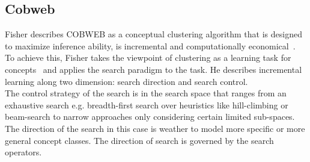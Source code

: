 \subsection{Cobweb}\label{\positionnumber}
Fisher describes COBWEB as a conceptual clustering algorithm that is designed to maximize inference ability, is incremental and computationally economical~\cite{Fisher1987}. To achieve this, Fisher takes the viewpoint of clustering as a learning task for concepts~\cite{mitchell1982generalization} and applies the search paradigm to the task. He describes incremental learning along two dimension: search direction and search control. \\
The control strategy of the search is in the search space that ranges from an exhaustive search e.g. breadth-first search over heuristics like hill-climbing or beam-search to narrow approaches only considering certain limited sub-spaces. \\

The direction of the search in this case is weather to model more specific or more general concept classes. The direction of search is governed by the search operators. \\

